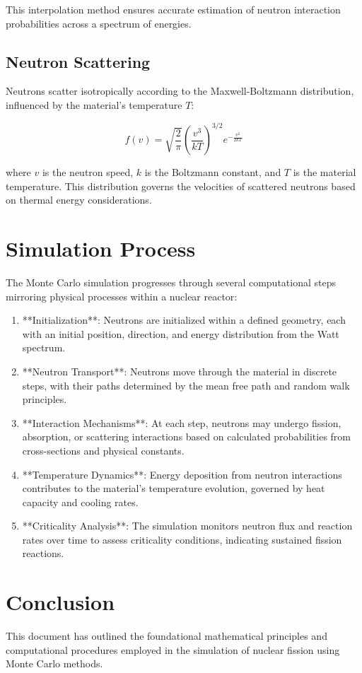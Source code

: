 \documentclass{article}
\begin{document}
This interpolation method ensures accurate estimation of neutron interaction probabilities across a spectrum of energies.

\subsection{Neutron Scattering}

Neutrons scatter isotropically according to the Maxwell-Boltzmann distribution, influenced by the material's temperature \( T \):

\begin{equation}
f(v) = \sqrt{\frac{2}{\pi}} \left(\frac{v^3}{kT}\right)^{3/2} e^{-\frac{v^2}{2kT}}
\end{equation}

where \( v \) is the neutron speed, \( k \) is the Boltzmann constant, and \( T \) is the material temperature. This distribution governs the velocities of scattered neutrons based on thermal energy considerations.

\section{Simulation Process}

The Monte Carlo simulation progresses through several computational steps mirroring physical processes within a nuclear reactor:

\begin{enumerate}
    \item **Initialization**: Neutrons are initialized within a defined geometry, each with an initial position, direction, and energy distribution from the Watt spectrum.
    \item **Neutron Transport**: Neutrons move through the material in discrete steps, with their paths determined by the mean free path and random walk principles.
    \item **Interaction Mechanisms**: At each step, neutrons may undergo fission, absorption, or scattering interactions based on calculated probabilities from cross-sections and physical constants.
    \item **Temperature Dynamics**: Energy deposition from neutron interactions contributes to the material's temperature evolution, governed by heat capacity and cooling rates.
    \item **Criticality Analysis**: The simulation monitors neutron flux and reaction rates over time to assess criticality conditions, indicating sustained fission reactions.
\end{enumerate}

\section{Conclusion}

This document has outlined the foundational mathematical principles and computational procedures employed in the simulation of nuclear fission using Monte Carlo methods.
\end{document}
